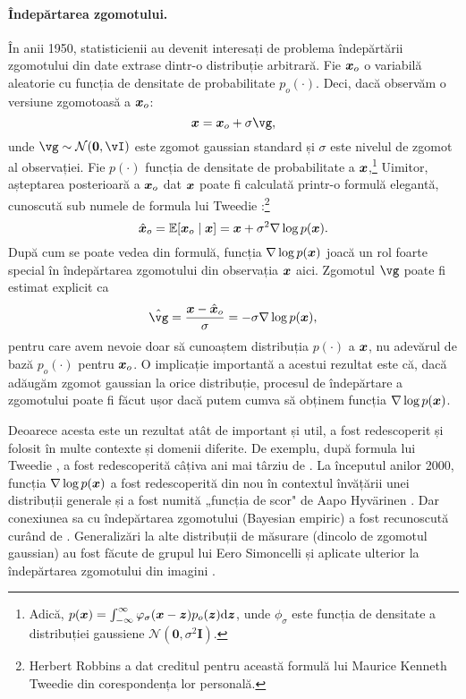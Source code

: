 \documentclass[../../book-main_ro.tex]{subfiles}
\begin{document}
\paragraph{Îndepărtarea zgomotului.} În anii 1950, statisticienii au devenit interesați de problema îndepărtării zgomotului din date extrase dintr-o distribuție arbitrară. Fie $\bm{x}_o$ o variabilă aleatorie cu funcția de densitate de probabilitate $p_o(\cdot)$. Deci, dacă observăm o versiune zgomotoasă a $\bm{x}_o$:
\begin{equation}
    \x = \x_o + \sigma \vg,
\end{equation}
unde $\vg \sim \dNorm(\vzero, \vI)$ este zgomot gaussian standard și $\sigma$ este nivelul de zgomot al observației. Fie $p(\cdot)$ funcția de densitate de probabilitate a $\bm{x}$,\footnote{Adică, $p(\bm{x}) = \int_{-\infty}^{\infty} \varphi_{\sigma}(\bm{x} - \bm{z})p_o(\bm{z}) \mathrm{d}\bm{z}$, unde $\phi_{\sigma}$ este funcția de densitate a distribuției gaussiene $\mathcal{N}(\boldsymbol{0}, \sigma^2 \boldsymbol{I})$.} Uimitor, așteptarea posterioară a $\bm{x}_o$ dat $\bm{x}$ poate fi calculată printr-o formulă elegantă, cunoscută sub numele de formula lui Tweedie \cite{Robbins1956AnEB}:\footnote{Herbert Robbins a dat creditul pentru această formulă lui Maurice Kenneth Tweedie din corespondența lor personală.}
\begin{equation}
    \hat {\bm{x}}_o = \mathbb{E}[\bm{x}_o\mid \bm{x}] = \bm{x} + \sigma^2 \nabla \log p(\bm{x}).
\end{equation}
După cum se poate vedea din formulă, funcția $\nabla \log p(\bm{x})$ joacă un rol foarte special în îndepărtarea zgomotului din observația $\bm{x}$ aici. Zgomotul $\vg$ poate fi estimat explicit ca
\begin{equation}
    \hat{\vg} = \frac{\x - \hat \x_o}{\sigma} = -\sigma \nabla \log p(\x),
\end{equation}
pentru care avem nevoie doar să cunoaștem distribuția $p(\cdot)$ a $\bm{x}$, nu adevărul de bază $p_o(\cdot)$ pentru $\bm{x}_o$. O implicație importantă a acestui rezultat este că, dacă adăugăm zgomot gaussian la orice distribuție, procesul de îndepărtare a zgomotului poate fi făcut ușor dacă putem cumva să obținem funcția $\nabla \log p(\bm{x})$.

Deoarece acesta este un rezultat atât de important și util, a fost redescoperit și folosit în multe contexte și domenii diferite. De exemplu, după formula lui Tweedie \cite{Robbins1956AnEB}, a fost redescoperită câțiva ani mai târziu de \cite{Miyasawa61}. La începutul anilor 2000, funcția $\nabla \log p(\bm{x})$ a fost redescoperită din nou în contextul învățării unei distribuții generale și a fost numită „funcția de scor" de Aapo Hyv\"{a}rinen \cite{hyvarinen05a}. Dar conexiunea sa cu îndepărtarea zgomotului (Bayesian empiric) a fost recunoscută curând de \cite{Vincent2011}.
Generalizări la alte distribuții de măsurare (dincolo de zgomotul gaussian) au fost făcute de grupul lui Eero Simoncelli \cite{Raphan10} și aplicate ulterior la îndepărtarea zgomotului din imagini \cite{Kadkhodaie21a,ho2020denoising}.
\end{document}
